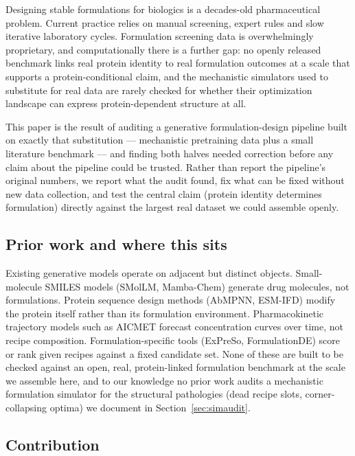 \documentclass[twocolumn,10pt]{article}
\begin{document}
Designing stable formulations for biologics is a decades-old pharmaceutical
problem. Current practice relies on manual screening, expert rules and slow
iterative laboratory cycles. Formulation screening data is overwhelmingly
proprietary, and computationally there is a further gap: no openly released
benchmark links real protein identity to real formulation outcomes at a scale
that supports a protein-conditional claim, and the mechanistic simulators used to
substitute for real data are rarely checked for whether their optimization
landscape can express protein-dependent structure at all.

This paper is the result of auditing a generative formulation-design pipeline
built on exactly that substitution --- mechanistic pretraining data plus a small
literature benchmark --- and finding both halves needed correction before any
claim about the pipeline could be trusted. Rather than report the pipeline's
original numbers, we report what the audit found, fix what can be fixed without
new data collection, and test the central claim (protein identity determines
formulation) directly against the largest real dataset we could assemble openly.

\subsection{Prior work and where this sits}

Existing generative models operate on adjacent but distinct objects.
Small-molecule SMILES models (SMolLM, Mamba-Chem) generate drug molecules, not
formulations. Protein sequence design methods (AbMPNN, ESM-IFD) modify the protein
itself rather than its formulation environment. Pharmacokinetic trajectory models
such as AICMET forecast concentration curves over time, not recipe composition.
Formulation-specific tools (ExPreSo, FormulationDE) score or rank given recipes
against a fixed candidate set. None of these are built to be checked against an
open, real, protein-linked formulation benchmark at the scale we assemble here,
and to our knowledge no prior work audits a mechanistic formulation simulator for
the structural pathologies (dead recipe slots, corner-collapsing optima) we
document in Section~\ref{sec:simaudit}.

\subsection{Contribution}
\end{document}
